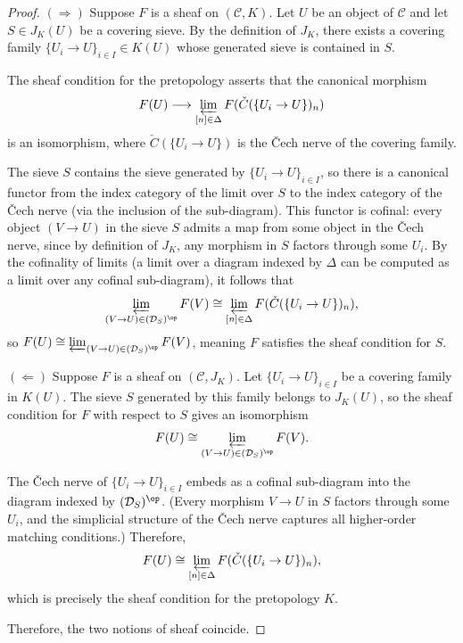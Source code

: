 \begin{proof}

    $(\Rightarrow)$ Suppose $F$ is a sheaf on $(\mathcal{C}, K)$. Let $U$ be an object of $\mathcal{C}$ and let $S \in J_K(U)$ be a covering sieve. By the definition of $J_K$, there exists a covering family $\{U_i \to U\}_{i \in I} \in K(U)$ whose generated sieve is contained in $S$.

    The sheaf condition for the pretopology asserts that the canonical morphism
    $$F(U) \longrightarrow \varprojlim_{[n] \in \Delta} F(\check{C}(\{U_i \to U\})_n)$$
    is an isomorphism, where $\check{C}(\{U_i \to U\})$ is the Čech nerve of the covering family.

    The sieve $S$ contains the sieve generated by $\{U_i \to U\}_{i \in I}$, so there is a canonical functor from the index category of the limit over $S$ to the index category of the Čech nerve (via the inclusion of the sub-diagram). This functor is cofinal: every object $(V \to U)$ in the sieve $S$ admits a map from some object in the Čech nerve, since by definition of $J_K$, any morphism in $S$ factors through some $U_i$. By the cofinality of limits (a limit over a diagram indexed by $\Delta$ can be computed as a limit over any cofinal sub-diagram), it follows that
    $$\varprojlim_{(V \to U) \in (\mathcal{D}_S)^{\op}} F(V) \cong \varprojlim_{[n] \in \Delta} F(\check{C}(\{U_i \to U\})_n),$$
    so $F(U) \cong \varprojlim_{(V \to U) \in (\mathcal{D}_S)^{\op}} F(V)$, meaning $F$ satisfies the sheaf condition for $S$.

    $(\Leftarrow)$ Suppose $F$ is a sheaf on $(\mathcal{C}, J_K)$. Let $\{U_i \to U\}_{i \in I}$ be a covering family in $K(U)$. The sieve $S$ generated by this family belongs to $J_K(U)$, so the sheaf condition for $F$ with respect to $S$ gives an isomorphism
    $$F(U) \cong \varprojlim_{(V \to U) \in (\mathcal{D}_S)^{\op}} F(V).$$

    The Čech nerve of $\{U_i \to U\}_{i \in I}$ embeds as a cofinal sub-diagram into the diagram indexed by $(\mathcal{D}_S)^{\op}$. (Every morphism $V \to U$ in $S$ factors through some $U_i$, and the simplicial structure of the Čech nerve captures all higher-order matching conditions.) Therefore,
    $$F(U) \cong \varprojlim_{[n] \in \Delta} F(\check{C}(\{U_i \to U\})_n),$$
    which is precisely the sheaf condition for the pretopology $K$.

    Therefore, the two notions of sheaf coincide.
\end{proof}